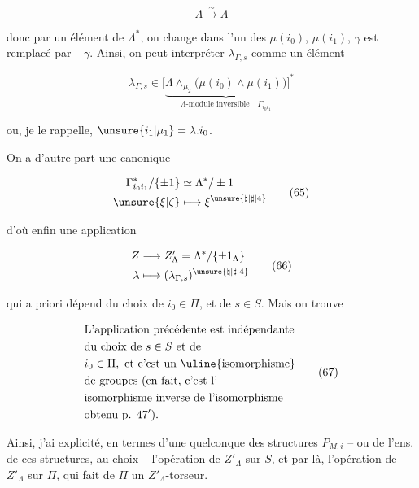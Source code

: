 \[
\Lambda\overset{\sim}{\longrightarrow}\Lambda
\]

donc par un élément \inserted{$\gamma$} de $\Lambda^*$,  on change  dans l'un des  $\mu(i_0)$, $\mu(i_1)$,  $\gamma$ est remplacé par $-\gamma$. Ainsi, on peut interpréter $\lambda_{\Gamma,s}$ comme un élément

\[
\lambda_{\Gamma,s}\in\bigl[\underbrace{\Lambda\wedge_{\mu_2}\bigl(\mu(i_0)\wedge\mu(i_1)\bigr)}_{\text{$\Lambda$-module inversible}\quad\Gamma_{i_0i_1}}\bigr]^{*}\tag*{(64)}
\]

ou, je le rappelle, $\unsure{i_1|\mu_1}=\lambda.i_0$.

On a d'autre part une   canonique

\[
\begin{aligned}
 \Gamma_{i_0i_1}^{*}/\{\pm1\}&\simeq\Lambda^*/\pm1\\
 \unsure{\xi|\zeta}&\longmapsto \xi^{\unsure{\natural|\sharp|4}}
\end{aligned}\tag*{(65)}
\]

d'où enfin une application

\[
\begin{aligned}
 Z&\longrightarrow Z'_\Lambda=\Lambda^*/\{\pm1_\Lambda\}\\
 \lambda&\longmapsto(\lambda_{\Gamma,s})^{\unsure{\natural|\sharp|4}}
\end{aligned}\tag*{(66)}
\]

qui a priori dépend du choix de $i_0\in\Pi$, et de $s\in S$. Mais on trouve

\[
\begin{aligned}
 &\text{L'application précédente est indépendante}\\
 &\text{du choix de }s\in S\text{ et de}\\
 &i_0\in\Pi,\ \text{et c'est un \uline{isomorphisme}}\\
 &\text{de groupes (en fait, c'est l'}\\
 &\text{isomorphisme inverse de l'isomorphisme}\\
 &\text{obtenu p. }47'\text{).}
\end{aligned}\tag*{(67)}
\]


Ainsi, j'ai explicité, en termes d'une quelconque des structures $P_{M,i}$ -- ou de l'ens. de ces structures, au choix  -- l'opération de $Z'_\Lambda$ sur $S$, et par là, l'opération de $Z'_\Lambda$ sur $\Pi$, qui fait de $\Pi$ un $Z'_\Lambda$-torseur.


